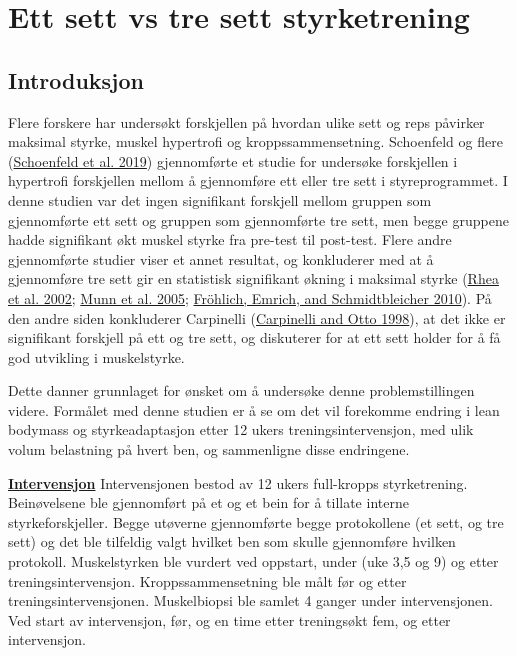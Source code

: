 \documentclass[
]{book}
\begin{document}
\hypertarget{ett-sett-vs-tre-sett-styrketrening}{%
\chapter{Ett sett vs tre sett
styrketrening}\label{ett-sett-vs-tre-sett-styrketrening}}

\hypertarget{introduksjon-1}{%
\section{Introduksjon}\label{introduksjon-1}}

Flere forskere har undersøkt forskjellen på hvordan ulike sett og reps
påvirker maksimal styrke, muskel hypertrofi og kroppssammensetning.
Schoenfeld og flere (\protect\hyperlink{ref-2019}{Schoenfeld et al.
2019}) gjennomførte et studie for undersøke forskjellen i hypertrofi
forskjellen mellom å gjennomføre ett eller tre sett i styreprogrammet. I
denne studien var det ingen signifikant forskjell mellom gruppen som
gjennomførte ett sett og gruppen som gjennomførte tre sett, men begge
gruppene hadde signifikant økt muskel styrke fra pre-test til post-test.
Flere andre gjennomførte studier viser et annet resultat, og konkluderer
med at å gjennomføre tre sett gir en statistisk signifikant økning i
maksimal styrke (\protect\hyperlink{ref-rhea2002}{Rhea et al. 2002};
\protect\hyperlink{ref-munn2005}{Munn et al. 2005};
\protect\hyperlink{ref-fruxf6hlich2010}{Fröhlich, Emrich, and
Schmidtbleicher 2010}). På den andre siden konkluderer Carpinelli
(\protect\hyperlink{ref-carpinelli1998}{Carpinelli and Otto 1998}), at
det ikke er signifikant forskjell på ett og tre sett, og diskuterer for
at ett sett holder for å få god utvikling i muskelstyrke.

Dette danner grunnlaget for ønsket om å undersøke denne
problemstillingen videre. Formålet med denne studien er å se om det vil
forekomme endring i lean bodymass og styrkeadaptasjon etter 12 ukers
treningsintervensjon, med ulik volum belastning på hvert ben, og
sammenligne disse endringene.

\underline{\textbf{Intervensjon}} Intervensjonen bestod av 12 ukers
full-kropps styrketrening. Beinøvelsene ble gjennomført på et og et bein
for å tillate interne styrkeforskjeller. Begge utøverne gjennomførte
begge protokollene (et sett, og tre sett) og det ble tilfeldig valgt
hvilket ben som skulle gjennomføre hvilken protokoll. Muskelstyrken ble
vurdert ved oppstart, under (uke 3,5 og 9) og etter
treningsintervensjon. Kroppssammensetning ble målt før og etter
treningsintervensjonen. Muskelbiopsi ble samlet 4 ganger under
intervensjonen. Ved start av intervensjon, før, og en time etter
treningsøkt fem, og etter intervensjon.
\end{document}
